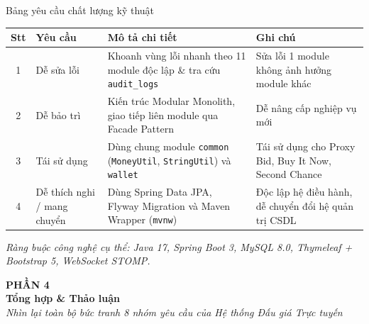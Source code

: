 \documentclass[aspectratio=169, 10pt]{beamer}
\begin{document}
\begin{frame}{Bảng yêu cầu chất lượng kỹ thuật}
    \footnotesize
    \begin{table}[h]
        \centering
        \begin{tabular}{c p{2.6cm} p{4.8cm} p{3.8cm}}
            \toprule
            \textbf{Stt} & \textbf{Yêu cầu} & \textbf{Mô tả chi tiết} & \textbf{Ghi chú} \\
            \midrule
            1 & Dễ sửa lỗi & Khoanh vùng lỗi nhanh theo 11 module độc lập \& tra cứu \texttt{audit\_logs} & Sửa lỗi 1 module không ảnh hưởng module khác \\
            \midrule
            2 & Dễ bảo trì & Kiến trúc Modular Monolith, giao tiếp liên module qua Facade Pattern & Dễ nâng cấp nghiệp vụ mới \\
            \midrule
            3 & Tái sử dụng & Dùng chung module \texttt{common} (\texttt{MoneyUtil}, \texttt{StringUtil}) và \texttt{wallet} & Tái sử dụng cho Proxy Bid, Buy It Now, Second Chance \\
            \midrule
            4 & Dễ thích nghi / mang chuyển & Dùng Spring Data JPA, Flyway Migration và Maven Wrapper (\texttt{mvnw}) & Độc lập hệ điều hành, dễ chuyển đổi hệ quản trị CSDL \\
            \bottomrule
        \end{tabular}
    \end{table}
    \vspace{0.15cm}
    \centering \textit{\footnotesize Ràng buộc công nghệ cụ thể: Java 17, Spring Boot 3, MySQL 8.0, Thymeleaf + Bootstrap 5, WebSocket STOMP.}
\end{frame}

\begin{frame}
    \begin{center}
        \vspace{1.5cm}
        {\Large \textbf{\color{primaryNavy}PHẦN 4}}\\[0.5cm]
        {\huge \textbf{\color{primaryNavy}Tổng hợp \& Thảo luận}}\\[0.6cm]
        \textit{\color{secondarySlate}Nhìn lại toàn bộ bức tranh 8 nhóm yêu cầu của Hệ thống Đấu giá Trực tuyến}
    \end{center}
\end{frame}
\end{document}
